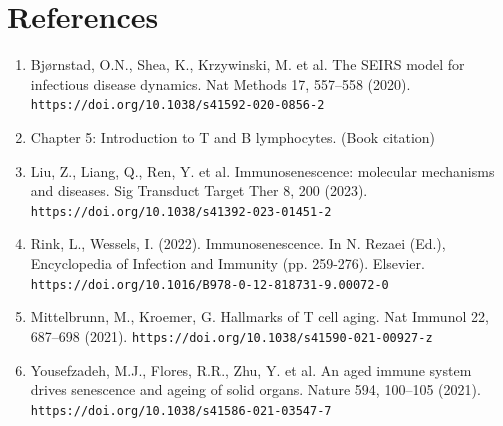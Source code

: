 \documentclass{article}
\begin{document}
\section*{References}

\begin{enumerate}
    \item Bjørnstad, O.N., Shea, K., Krzywinski, M. et al. The SEIRS model for infectious disease dynamics. Nat Methods 17, 557–558 (2020). \texttt{https://doi.org/10.1038/s41592-020-0856-2}
    
    \item Chapter 5: Introduction to T and B lymphocytes. (Book citation)
    
    \item Liu, Z., Liang, Q., Ren, Y. et al. Immunosenescence: molecular mechanisms and diseases. Sig Transduct Target Ther 8, 200 (2023). \texttt{https://doi.org/10.1038/s41392-023-01451-2}
    
    \item Rink, L., Wessels, I. (2022). Immunosenescence. In N. Rezaei (Ed.), Encyclopedia of Infection and Immunity (pp. 259-276). Elsevier. \texttt{https://doi.org/10.1016/B978-0-12-818731-9.00072-0}
    
    \item Mittelbrunn, M., Kroemer, G. Hallmarks of T cell aging. Nat Immunol 22, 687–698 (2021). \texttt{https://doi.org/10.1038/s41590-021-00927-z}
    
    \item Yousefzadeh, M.J., Flores, R.R., Zhu, Y. et al. An aged immune system drives senescence and ageing of solid organs. Nature 594, 100–105 (2021). \texttt{https://doi.org/10.1038/s41586-021-03547-7}
\end{enumerate}
\end{document}
